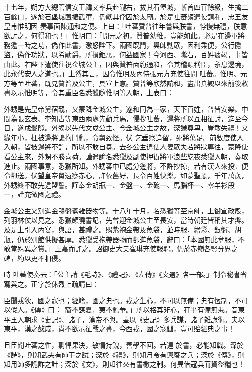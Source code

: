 \begin{pinyinscope}
 十七年，朔方大總管信安王禕又率兵赴隴右，拔其石堡城，斬首四百餘級，生擒二百餘口，遂於石堡城置振武軍，仍獻其俘囚於太廟。於是吐蕃頻遣使請和，忠王友皇甫惟明因
 奏事面陳通和之便。上曰：「吐蕃贊普往年嘗與朕書，悖慢無禮，朕意欲討之，何得和也！」惟明曰：「開元之初，贊普幼稚，豈能如此。必是在邊軍將務邀一時之功，偽作此書，激怒陛下。兩國既鬥，興師動眾，因利乘便，公行隱盜，偽作功狀，以希勛爵，所損鉅萬，何益國家！今河西、隴右，百姓疲竭，事皆由此。若陛下遣使往視金城公主，因與贊普面約通和，令其稽顙稱臣，永息邊境，此永代安人之道也。」上然其言，因令惟明及內侍張元方充使往問
 吐蕃。惟明、元方等至吐蕃，既見贊普及公主，具宣上意。贊普等欣然請和，盡出貞觀以來前後敕書以示惟明等，令其重臣名悉獵隨惟明等入朝，上表曰：



 外甥是先皇帝舅宿親，又蒙降金城公主，遂和同為一家，天下百姓，普皆安樂。中間為張玄表、李知古等東西兩處先動兵馬，侵抄吐蕃，邊將所以互相征討，迄至今日，遂成釁隙。外甥以先代文成公主、今金城公主之故，深識尊卑，豈敢失禮！又緣年小，枉被邊將讒拘鬥亂，令舅致怪。伏
 乞垂察追留，死將萬足。前數度使人入朝，皆被邊將不許，所以不敢自奏。去冬公主遣使人婁眾失若將狀專往，蒙降使看公主來，外甥不勝喜荷。謹遣諭名悉獵及副使押衙將軍浪些紇夜悉獵入朝，奏取進止。兩國事意，悉獵所知。外甥蕃中已處分邊將，不許抄掠，若有漢人來投，便令卻送。伏望皇帝舅遠察赤心，許依舊好，長令百姓快樂。如蒙聖恩，千年萬歲，外甥終不敢先違盟誓。謹奉金胡瓶一、金盤一、金碗一、馬腦杯一、零羊衫段
 一，謹充微國之禮。



 金城公主又別進金鴨盤盞雜器物等。十八年十月，名悉獵等至京師，上御宣政殿，列羽林仗以見之。悉獵頗曉書記，先曾迎金城公主至長安，當時朝廷皆稱其才辯。及是上引入內宴，與語，甚禮之。賜紫袍金帶及魚袋，並時服、繒彩、銀盤、胡瓶，仍於別館供擬甚厚。悉獵受袍帶器物而卻進魚袋，辭曰：「本國無此章服，不敢當殊異之賞。」上嘉而許之。詔御史大夫崔琳充使報聘。仍於赤嶺各豎分界之碑，約以更不相侵。



 時
 吐蕃使奏云：「公主請《毛詩》、《禮記》、《左傳》《文選》各一部。」制令秘書省寫與之。正字於休烈上疏請曰：



 臣聞戎狄，國之寇也；經籍，國之典也。戎之生心，不可以無備；典有恆制，不可以假人。《傳》曰：「裔不謀夏，夷不亂華。」所以格其非心，在乎有備無患。昔東平王入朝求《史記》、諸子，漢帝不與。蓋以《史記》多兵謀，諸子雜詭術。夫以東平，漢之懿戚，尚不欲示征戰之書，今西戎，國之寇讎，豈可貽經典之事！



 且臣聞吐蕃之性，剽悍果決，敏情持銳，善學不回。若達
 於書，必能知戰。深於《詩》，則知武夫有師干之試；深於《禮》，則知月令有興廢之兵；深於《傳》，則知用師多詭詐之計；深於《文》，則知往來有書檄之制。何異借寇兵而資盜糧也！




\end{pinyinscope}
